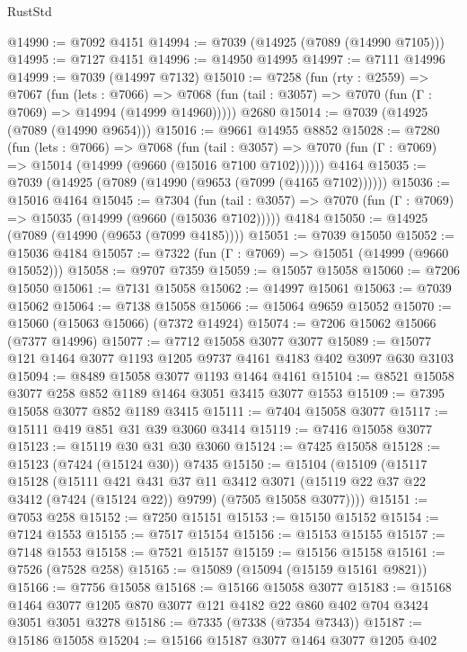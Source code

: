 \begin{lexlean}{RustStd}
\begin{coremodule}
@14990 := @7092 @4151
@14994 := @7039 (@14925 (@7089 (@14990 @7105)))
@14995 := @7127 @4151
@14996 := @14950 @14995
@14997 := @7111 @14996
@14999 := @7039 (@14997 @7132)
@15010 := @7258
    (fun (rty : @2559) =>
    @7067
      (fun (lets : @7066) =>
      @7068 (fun (tail : @3057) => @7070 (fun (Γ : @7069) => @14994 (@14999 @14960)))))
    @2680
@15014 := @7039 (@14925 (@7089 (@14990 @9654)))
@15016 := @9661 @14955 @8852
@15028 := @7280
    (fun (lets : @7066) =>
    @7068
      (fun (tail : @3057) =>
      @7070 (fun (Γ : @7069) => @15014 (@14999 (@9660 (@15016 @7100 @7102))))))
    @4164
@15035 := @7039 (@14925 (@7089 (@14990 (@9653 (@7099 (@4165 @7102))))))
@15036 := @15016 @4164
@15045 := @7304
    (fun (tail : @3057) => @7070 (fun (Γ : @7069) => @15035 (@14999 (@9660 (@15036 @7102)))))
    @4184
@15050 := @14925 (@7089 (@14990 (@9653 (@7099 @4185))))
@15051 := @7039 @15050
@15052 := @15036 @4184
@15057 := @7322 (fun (Γ : @7069) => @15051 (@14999 (@9660 @15052)))
@15058 := @9707 @7359
@15059 := @15057 @15058
@15060 := @7206 @15050
@15061 := @7131 @15058
@15062 := @14997 @15061
@15063 := @7039 @15062
@15064 := @7138 @15058
@15066 := @15064 @9659 @15052
@15070 := @15060 (@15063 @15066) (@7372 @14924)
@15074 := @7206 @15062 @15066 (@7377 @14996)
@15077 := @7712 @15058 @3077 @3077
@15089 := @15077 @121 @1464 @3077 @1193 @1205 @9737 @4161 @4183 @402 @3097 @630 @3103
@15094 := @8489 @15058 @3077 @1193 @1464 @4161
@15104 := @8521 @15058 @3077 @258 @852 @1189 @1464 @3051 @3415 @3077 @1553
@15109 := @7395 @15058 @3077 @852 @1189 @3415
@15111 := @7404 @15058 @3077
@15117 := @15111 @419 @851 @31 @39 @3060 @3414
@15119 := @7416 @15058 @3077
@15123 := @15119 @30 @31 @30 @3060
@15124 := @7425 @15058
@15128 := @15123 (@7424 (@15124 @30)) @7435
@15150 := @15104
    (@15109
      (@15117
        @15128
        (@15111
          @421
          @431
          @37
          @11
          @3412
          @3071
          (@15119 @22 @37 @22 @3412 (@7424 (@15124 @22)) @9799)
          (@7505 @15058 @3077))))
@15151 := @7053 @258
@15152 := @7250 @15151
@15153 := @15150 @15152
@15154 := @7124 @1553
@15155 := @7517 @15154
@15156 := @15153 @15155
@15157 := @7148 @1553
@15158 := @7521 @15157
@15159 := @15156 @15158
@15161 := @7526 (@7528 @258)
@15165 := @15089 (@15094 (@15159 @15161 @9821))
@15166 := @7756 @15058
@15168 := @15166 @15058 @3077
@15183 := @15168 @1464 @3077 @1205 @870 @3077 @121 @4182 @22 @860 @402 @704 @3424 @3051 @3051 @3278
@15186 := @7335 (@7338 (@7354 @7343))
@15187 := @15186 @15058
@15204 := @15166
    @15187
    @3077
    @1464
    @3077
    @1205
    @402

\end{coremodule}
\end{lexlean}
